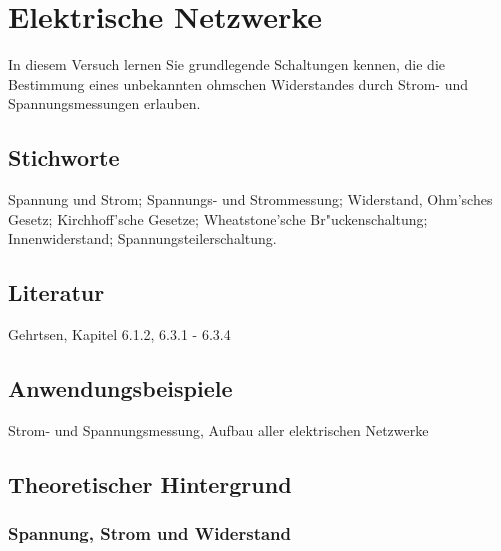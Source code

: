 \chapter{Elektrische Netzwerke}
\label{v:13}

In diesem Versuch lernen Sie grundlegende Schaltungen kennen, die die Bestimmung eines unbekannten ohmschen Widerstandes durch Strom- und Spannungsmessungen erlauben. 

\section{Stichworte}

Spannung und Strom; Spannungs- und Strommessung; Widerstand, Ohm'sches Gesetz; Kirchhoff'sche Gesetze; Wheatstone'sche Br"uckenschaltung; Innenwiderstand; Spannungsteilerschaltung.
%
\section{Literatur}

Gehrtsen, Kapitel 6.1.2, 6.3.1 - 6.3.4
%
\section{Anwendungsbeispiele}

Strom- und Spannungsmessung, Aufbau aller elektrischen Netzwerke

\section{Theoretischer Hintergrund}

\subsection{Spannung, Strom und Widerstand}

